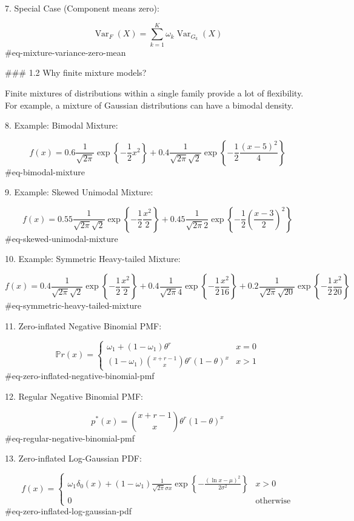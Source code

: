 7. Special Case (Component means zero):


$$
\operatorname{Var}_F(X) = \sum_{k=1}^K \omega_k \operatorname{Var}_{G_k}(X)
$$ {#eq-mixture-variance-zero-mean}

### 1.2 Why finite mixture models?

Finite mixtures of distributions within a single family provide a lot of flexibility. For example, a mixture of Gaussian distributions can have a bimodal density.

8. Example: Bimodal Mixture:

$$
f(x) = 0.6 \frac{1}{\sqrt{2\pi}} \exp\left\{ -\frac{1}{2}x^2 \right\} 
     + 0.4 \frac{1}{\sqrt{2\pi}\sqrt{2}} \exp\left\{ -\frac{1}{2}\frac{(x-5)^2}{4} \right\}
$$ {#eq-bimodal-mixture}

9. Example: Skewed Unimodal Mixture:

$$
f(x) = 0.55 \frac{1}{\sqrt{2\pi}\sqrt{2}} \exp\left\{ -\frac{1}{2} \frac{x^2}{2} \right\}
    + 0.45 \frac{1}{\sqrt{2\pi} 2} \exp\left\{ -\frac{1}{2}\left(\frac{x-3}{2}\right)^2 \right\}
$$ {#eq-skewed-unimodal-mixture}

10. Example: Symmetric Heavy-tailed Mixture:

$$
f(x) = 0.4 \frac{1}{\sqrt{2\pi}\sqrt{2}} \exp\left\{ -\frac{1}{2} \frac{x^2}{2} \right\}
    + 0.4 \frac{1}{\sqrt{2\pi} 4} \exp\left\{ -\frac{1}{2} \frac{x^2}{16} \right\}
    + 0.2 \frac{1}{\sqrt{2\pi} \sqrt{20}} \exp\left\{ -\frac{1}{2} \frac{x^2}{20} \right\}
$$ {#eq-symmetric-heavy-tailed-mixture}

11. Zero-inflated Negative Binomial PMF:

$$
\mathbb{P}r(x) = 
\begin{cases}
    \omega_1 + (1-\omega_1)\theta^r & x=0 \\
    (1-\omega_1) \binom{x+r-1}{x} \theta^r (1-\theta)^x & x>1
\end{cases}
$$ {#eq-zero-inflated-negative-binomial-pmf}

12. Regular Negative Binomial PMF:

$$
p^*(x) = \binom{x+r-1}{x} \theta^r (1-\theta)^x
$$ {#eq-regular-negative-binomial-pmf}

13. Zero-inflated Log-Gaussian PDF:

$$
f(x) = 
\begin{cases}
    \omega_1 \delta_0(x) + (1-\omega_1)\frac{1}{\sqrt{2\pi}\sigma x}\exp\left\{ -\frac{(\ln x - \mu)^2}{2\sigma^2} \right\} & x > 0 \\
    0 & \text{otherwise}
\end{cases}
$$ {#eq-zero-inflated-log-gaussian-pdf}

